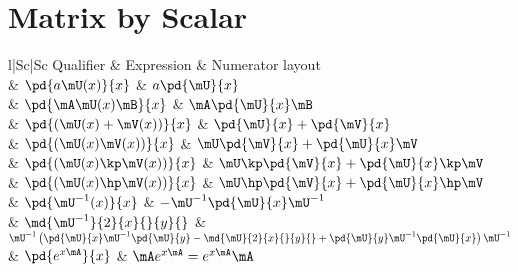 \section{Matrix by Scalar}
\begin{center}
\begin{tabular}{l|Sc|Sc}
Qualifier                  & Expression                                     & Numerator layout                                       \\
                           & $\pd{a\mU(x)}{x}$                              & $a\pd{\mU}{x}$                                         \\
                           & $\pd{\mA\mU(x)\mB}{x}$                         & $\mA\pd{\mU}{x}\mB$                                    \\
                           & $\pd{(\mU(x)+\mV(x))}{x}$                      & $\pd{\mU}{x}+\pd{\mV}{x}$                              \\
                           & $\pd{(\mU(x)\mV(x))}{x}$                       & $\mU\pd{\mV}{x}+\pd{\mU}{x}\mV$                        \\
                           & $\pd{(\mU(x)\kp\mV(x))}{x}$                    & $\mU\kp\pd{\mV}{x} + \pd{\mU}{x}\kp\mV$                \\
                           & $\pd{(\mU(x)\hp\mV(x))}{x}$                    & $\mU\hp\pd{\mV}{x} + \pd{\mU}{x}\hp\mV$                \\
                           & $\pd{\mU^{-1}(x)}{x}$                          & $-\mU^{-1} \pd{\mU}{x} \mU^{-1}$                       \\
                           & $\md{\mU^{-1}}{2}{x}{}{y}{}$                   & $\mU^{-1}\left(\pd{\mU}{x}\mU^{-1}\pd{\mU}{y} - \md{\mU}{2}{x}{}{y}{} + \pd{\mU}{y}\mU^{-1}\pd{\mU}{x}\right)\mU^{-1}$ \\
                           & $\pd{e^{x\mA}}{x}$                             & $\mA e^{x\mA}=e^{x\mA}\mA$
\end{tabular}
\end{center}

